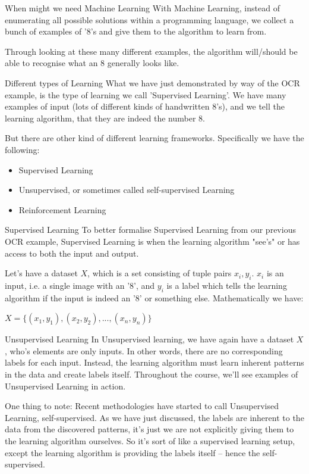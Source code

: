 \documentclass[10pt]{beamer}
\begin{document}
\begin{frame}[label={sec:org98bac7d}]{When might we need Machine Learning}
With Machine Learning, instead of enumerating all possible solutions within a
programming language, we collect a bunch of examples of '8's and give them to the
algorithm to learn from.

Through looking at these many different examples, the algorithm will/should be able
to recognise what an 8 generally looks like.
\end{frame}

\begin{frame}[label={sec:orgd11bd01}]{Different types of Learning}
What we have just demonstrated by way of the OCR example, is the type of learning we
call 'Supervised Learning'. We have many examples of input (lots of different kinds
of handwritten 8's), and we tell the learning algorithm, that they are indeed the
number 8.

But there are other kind of different learning frameworks. Specifically we have the
following:

\begin{itemize}
\item Supervised Learning
\item Unsupervised, or sometimes called self-supervised Learning
\item Reinforcement Learning
\end{itemize}
\end{frame}

\begin{frame}[label={sec:orgad3a736}]{Supervised Learning}
To better formalise Supervised Learning from our previous OCR example, Supervised
Learning is when the learning algorithm "see's" or has access to both the input and
output.

Let's have a dataset \(X\), which is a set consisting of tuple pairs \(x_i, y_i\). \(x_i\)
is an input, i.e. a single image with an '8', and \(y_i\) is a label which tells the
learning algorithm if the input is indeed an '8' or something else. Mathematically we have:

\(X = \{(x_1, y_1), (x_2, y_2), ..., (x_n, y_n)\}\)
\end{frame}

\begin{frame}[label={sec:org4f2aa24}]{Unsupervised Learning}
In Unsupervised learning, we have again have a dataset \(X\), who's elements are only
inputs. In other words, there are no corresponding labels for each input. Instead,
the learning algorithm must learn inherent patterns in the data and create labels
itself. Throughout the course, we'll see examples of Unsupervised Learning in action.

One thing to note: Recent methodologies have started to call Unsupervised Learning,
self-supervised. As we have just discussed, the labels are inherent to the data from
the discovered patterns, it's just we are not explicitly giving them to the learning
algorithm ourselves. So it's sort of like a supervised learning setup, except the
learning algorithm is providing the labels itself -- hence the self-supervised.
\end{frame}
\end{document}

